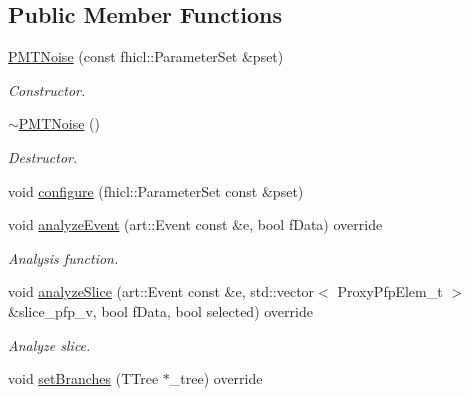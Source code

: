 \subsection*{Public Member Functions}
\begin{DoxyCompactItemize}
\item 
\hyperlink{classanalysis_1_1PMTNoise_a68d40e2ae135ebc8d8dbe3f756ee1850}{P\-M\-T\-Noise} (const fhicl\-::\-Parameter\-Set \&pset)
\begin{DoxyCompactList}\small\item\em Constructor. \end{DoxyCompactList}\item 
\hypertarget{classanalysis_1_1PMTNoise_a10c11f2bd8fd9a55ff8cb816ae23bf33}{\hyperlink{classanalysis_1_1PMTNoise_a10c11f2bd8fd9a55ff8cb816ae23bf33}{$\sim$\-P\-M\-T\-Noise} ()}\label{classanalysis_1_1PMTNoise_a10c11f2bd8fd9a55ff8cb816ae23bf33}

\begin{DoxyCompactList}\small\item\em Destructor. \end{DoxyCompactList}\item 
void \hyperlink{classanalysis_1_1PMTNoise_ac68d1b71ec42d1a6baf987d867775fd1}{configure} (fhicl\-::\-Parameter\-Set const \&pset)
\item 
void \hyperlink{classanalysis_1_1PMTNoise_a939447b8cffa89d11d7f7bc3c99378a6}{analyze\-Event} (art\-::\-Event const \&e, bool f\-Data) override
\begin{DoxyCompactList}\small\item\em Analysis function. \end{DoxyCompactList}\item 
\hypertarget{classanalysis_1_1PMTNoise_a4c427fe82fe00639048c4a04e29155c8}{void \hyperlink{classanalysis_1_1PMTNoise_a4c427fe82fe00639048c4a04e29155c8}{analyze\-Slice} (art\-::\-Event const \&e, std\-::vector$<$ Proxy\-Pfp\-Elem\-\_\-t $>$ \&slice\-\_\-pfp\-\_\-v, bool f\-Data, bool selected) override}\label{classanalysis_1_1PMTNoise_a4c427fe82fe00639048c4a04e29155c8}

\begin{DoxyCompactList}\small\item\em Analyze slice. \end{DoxyCompactList}\item 
\hypertarget{classanalysis_1_1PMTNoise_acece0a0e60bb9484a1da303cdeb25356}{void \hyperlink{classanalysis_1_1PMTNoise_acece0a0e60bb9484a1da303cdeb25356}{set\-Branches} (T\-Tree $\ast$\-\_\-tree) override}\label{classanalysis_1_1PMTNoise_acece0a0e60bb9484a1da303cdeb25356}


\end{DoxyCompactItemize}
